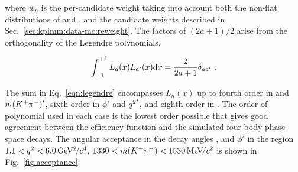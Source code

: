 \noindent where $w_{n}$ is the per-candidate weight taking into account both the non-flat distributions of \qsq and \mkpi, and the candidate weights described in Sec.~\ref{sec:kpimm:data-mc:reweight}. The factors of $(2a + 1)/2$ arise from the orthogonality of the Legendre polynomials,
 
\begin{equation}
\int_{-1}^{+1} L_{a}(x) L_{a'}(x) \mathrm{d} x = \frac{2}{2 a + 1}\delta_{ a a'}  ~.
\end{equation}

 The sum in Eq.~\ref{eqn:legendre} encompasses $L_n(x)$ up to fourth order in \ctl and $m({{K}^+}{{\pi}^-})'$, sixth order in $\phi'$ and ${q^2}'$, and eighth order in \ctk. The order of polynomial used in each case is the lowest order possible that gives good agreement between the efficiency function and the simulated four-body \BdToKpimm phase-space decays. The angular acceptance in the decay angles \ctl, \ctk and $\phi'$ in the region $1.1<{q^2}<6.0{\mathrm{\,Ge\kern -0.1em V^2\!/}c^4}$, $1330<m({{K}^+}{{\pi}^-})<1530{\mathrm{\,Me\kern -0.1em V\!/}c^2}$ is shown in Fig.~\ref{fig:acceptance}.

